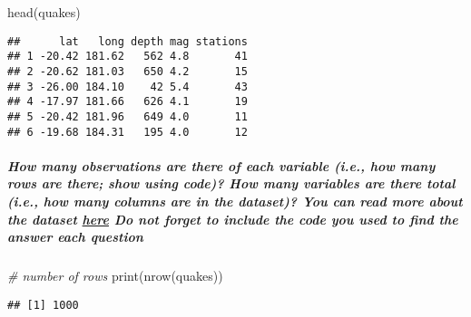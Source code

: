 \documentclass[
]{article}
\newenvironment{Shaded}{\begin{snugshade}}{\end{snugshade}}
\newcommand{\CommentTok}[1]{\textcolor[rgb]{0.56,0.35,0.01}{\textit{#1}}}
\newcommand{\FunctionTok}[1]{\textcolor[rgb]{0.00,0.00,0.00}{#1}}
\newcommand{\NormalTok}[1]{#1}
\begin{document}
\begin{Shaded}
\begin{Highlighting}[]
\FunctionTok{head}\NormalTok{(quakes)}
\end{Highlighting}
\end{Shaded}

\begin{verbatim}
##      lat   long depth mag stations
## 1 -20.42 181.62   562 4.8       41
## 2 -20.62 181.03   650 4.2       15
## 3 -26.00 184.10    42 5.4       43
## 4 -17.97 181.66   626 4.1       19
## 5 -20.42 181.96   649 4.0       11
## 6 -19.68 184.31   195 4.0       12
\end{verbatim}

\hypertarget{how-many-observations-are-there-of-each-variable-i.e.-how-many-rows-are-there-show-using-code-how-many-variables-are-there-total-i.e.-how-many-columns-are-in-the-dataset-you-can-read-more-about-the-dataset-here-do-not-forget-to-include-the-code-you-used-to-find-the-answer-each-question}{%
\subparagraph{\texorpdfstring{How many observations are there of each
variable (i.e., how many rows are there; show using code)? How many
variables are there total (i.e., how many columns are in the dataset)?
You can read more about the dataset
\href{https://stat.ethz.ch/R-manual/R-patched/library/datasets/html/quakes.html}{here}
\emph{Do not forget to include the code you used to find the answer each
question}}{How many observations are there of each variable (i.e., how many rows are there; show using code)? How many variables are there total (i.e., how many columns are in the dataset)? You can read more about the dataset here Do not forget to include the code you used to find the answer each question}}\label{how-many-observations-are-there-of-each-variable-i.e.-how-many-rows-are-there-show-using-code-how-many-variables-are-there-total-i.e.-how-many-columns-are-in-the-dataset-you-can-read-more-about-the-dataset-here-do-not-forget-to-include-the-code-you-used-to-find-the-answer-each-question}}

\begin{Shaded}
\begin{Highlighting}[]
\CommentTok{\# number of rows}
\FunctionTok{print}\NormalTok{(}\FunctionTok{nrow}\NormalTok{(quakes))}
\end{Highlighting}
\end{Shaded}

\begin{verbatim}
## [1] 1000
\end{verbatim}
\end{document}
